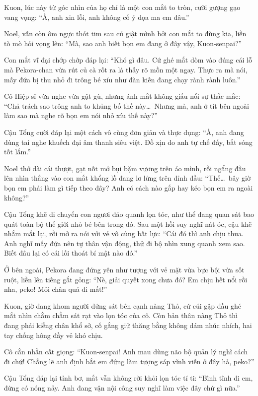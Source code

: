 \documentclass[../main.tex]{subfiles}
\begin{document}
Kuon, lúc này từ góc nhìn của họ chỉ là một con mắt to tròn, cười gượng gạo vang vọng: ``À, anh xin lỗi, anh không cố ý dọa ma em đâu.''

Noel, vẫn còn ôm ngực thót tim sau cú giật mình bởi con mắt to đùng kia, liền tò mò hỏi vọng lên: ``Mà, sao anh biết bọn em đang ở đây vậy, Kuon-senpai?''

Con mắt vĩ đại chớp chớp đáp lại: ``Khó gì đâu. Cứ ghé mắt dòm vào đúng cái lỗ mà Pekora-chan vừa rút củ cà rốt ra là thấy rõ mồn một ngay. Thực ra mà nói, mấy đứa bị thu nhỏ đi trông bé xíu như đàn kiến đang chạy rành rành luôn.''

Cô Hiệp sĩ vừa nghe vừa gật gù, nhưng ánh mắt không giấu nổi sự thắc mắc: ``Chả trách sao trông anh to khủng bố thế này\dots\ Nhưng mà, anh ở tít bên ngoài làm sao mà nghe rõ bọn em nói nhỏ xíu thế này?''

Cậu Tổng cười đáp lại một cách vô cùng đơn giản và thực dụng: ``À, anh đang dùng tai nghe khuếch đại âm thanh siêu việt. Đồ xịn do anh tự chế đấy, bắt sóng tốt lắm.''

Noel thở dài cái thượt, gạt nốt mớ bụi bặm vương trên áo mình, rồi ngẩng đầu lên nhìn thẳng vào con mắt khổng lồ đang lơ lửng trên đỉnh đầu: ``Thế\dots\ bây giờ bọn em phải làm gì tiếp theo đây? Anh có cách nào gắp hay kéo bọn em ra ngoài không?''

Cậu Tổng khẽ di chuyển con ngươi đảo quanh lọn tóc, như thể đang quan sát bao quát toàn bộ thế giới nhỏ bé bên trong đó. Sau một hồi suy nghĩ nát óc, cậu khẽ nhắm mắt lại, rồi mở ra nói với vẻ vô cùng bất lực: ``Cái đó thì anh chịu thua. Anh nghĩ mấy đứa nên tự thân vận động, thử đi bộ nhìn xung quanh xem sao. Biết đâu lại có cái lối thoát bí mật nào đó.''

Ở bên ngoài, Pekora đang đứng yên như tượng với vẻ mặt vừa bực bội vừa sốt ruột, liền lên tiếng gắt gỏng: ``Nè, giải quyết xong chưa đó? Em chịu hết nổi rồi nha, peko! Mỏi chân quá đi mất!''

Kuon, giờ đang khom người đứng sát bên cạnh nàng Thỏ, cứ cúi gập đầu ghé mắt nhìn chằm chằm sát rạt vào lọn tóc của cô. Còn bản thân nàng Thỏ thì đang phải kiễng chân khổ sở, cố gắng giữ thăng bằng không dám nhúc nhích, hai tay chống hông đầy vẻ khó chịu.

Cô cằn nhằn cất giọng: ``Kuon-senpai! Anh mau dùng não bộ quản lý nghĩ cách đi chứ! Chẳng lẽ anh định bắt em đứng làm tượng sáp vĩnh viễn ở đây hả, peko?''

Cậu Tổng đáp lại tỉnh bơ, mắt vẫn không rời khỏi lọn tóc tí ti: ``Bình tĩnh đi em, đừng có nóng nảy. Anh đang vận nội công suy nghĩ làm việc đây chứ gì nữa.''
\end{document}
